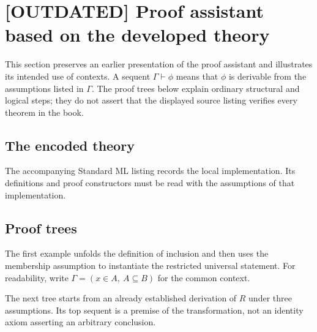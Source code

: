 \def\topic{Proof assistant}

\section{[OUTDATED] Proof assistant based on the developed theory}
This section preserves an earlier presentation of the proof assistant and
illustrates its intended use of contexts. A sequent $\Gamma\vdash\phi$
means that $\phi$ is derivable from the assumptions listed in $\Gamma$.
The proof trees below explain ordinary structural and logical steps; they
do not assert that the displayed source listing verifies every theorem in
the book.

\subsection{The encoded theory}
The accompanying Standard ML listing records the local implementation.
Its definitions and proof constructors must be read with the assumptions
of that implementation.

\restoregeometry

\subsection{Proof trees}
The first example unfolds the definition of inclusion and then uses the
membership assumption to instantiate the restricted universal statement.
For readability, write $\Gamma=(x\in A,\ A\subseteq B)$ for the common context.
\begin{prooftree}
\end{prooftree}

The next tree starts from an already established derivation of $R$ under
three assumptions. Its top sequent is a premise of the transformation,
not an identity axiom asserting an arbitrary conclusion.
\begin{prooftree}
\end{prooftree}

